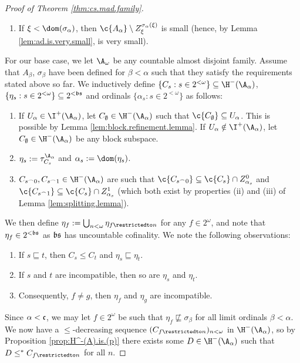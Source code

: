 \documentclass[11pt,reqno]{amsart}
\begin{document}
\begin{proof}[Proof of Theorem \ref{thm:cs.mad.family}]
\begin{enumerate}
        \item If $\xi < \dom(\sigma_\alpha)$, then $\c{A_\alpha} \setminus Z_\xi^{\sigma_\alpha(\xi)}$ is small (hence, by Lemma \ref{lem:ad.is.very.small}, is very small).
    \end{enumerate}
    For our base case, we let $\A_\omega$ be any countable almost disjoint family. Assume that $A_\beta$, $\sigma_\beta$ have been defined for $\beta < \alpha$ such that they satisfy the requirements stated above so far. We inductively define $\{C_s : s \in 2^{<\omega}\} \subseteq \H^-(\A_\alpha)$, $\{\eta_s : s \in 2^{<\omega}\} \subseteq 2^{<\frak{bs}}$ and ordinals $\{\alpha_s : s \in 2^{<\omega}\}$ as follows:
    \begin{enumerate}
        \item If $U_\alpha \in \I^+(\A_\alpha)$, let $C_\emptyset \in \H^-(\A_\alpha)$ such that $\c{C_\emptyset} \subseteq U_\alpha$. This is possible by Lemma \ref{lem:block.refinement.lemma}. If $U_\alpha \notin \I^+(\A_\alpha)$, let $C_\emptyset \in \H^-(\A_\alpha)$ be any block subspace.

        \item $\eta_s := \tau_{C_s}^{\A_\alpha}$ and $\alpha_s := \dom(\eta_s)$.

        \item $C_{s^\frown0},C_{s^\frown1} \in \H^-(\A_\alpha)$ are such that $\c{C_{s^\frown0}} \subseteq \c{C_s} \cap Z_{\alpha_s}^0$ and $\c{C_{s^\frown1}} \subseteq \c{C_s} \cap Z_{\alpha_s}^1$ (which both exist by properties (ii) and (iii) of Lemma \ref{lem:splitting.lemma}).
    \end{enumerate}
    We then define $\eta_f := \bigcup_{n<\omega} \eta_{f\restrictedto n}$ for any $f \in 2^\omega$, and note that $\eta_f \in 2^{<\frak{bs}}$ as $\frak{bs}$ has uncountable cofinality. We note the following observations:
    \begin{enumerate}
        \item If $s \sqsubseteq t$, then $C_s \leq C_t$ and $\eta_s \sqsubseteq \eta_t$.

        \item If $s$ and $t$ are incompatible, then so are $\eta_s$ and $\eta_t$.

        \item Consequently, $f \neq g$, then $\eta_f$ and $\eta_g$ are incompatible.
    \end{enumerate}
    Since $\alpha < \frak{c}$, we may let $f \in 2^\omega$ be such that $\eta_f \not\sqsubseteq \sigma_\beta$ for all limit ordinals $\beta < \alpha$. We now have a $\leq$-decreasing sequence $(C_{f\restrictedto n})_{n<\omega}$ in $\H^-(\A_\alpha)$, so by Proposition \ref{prop:H^-(A).is.(p)} there exists some $D \in \H^-(\A_\alpha)$ such that $D \leq^* C_{f\restrictedto n}$ for all $n$.


\end{proof}
\end{document}
